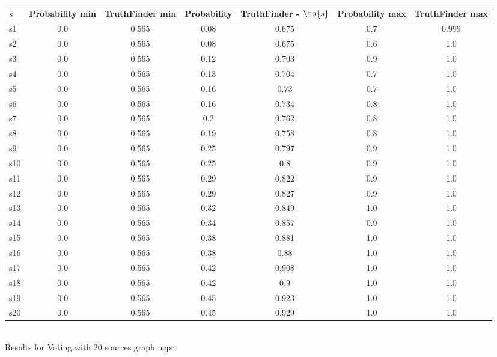 \documentclass{article}
\begin{document}
\noindent\begin{tabular}{|l|c|c|c|c|c|c|}
\hline
$s$& Probability min & TruthFinder min & Probability & TruthFinder - $\ts{s}$ & Probability max & TruthFinder max\\
\hline
s1 &0.0 & 0.565 & 0.08 & 0.675 & 0.7 & 0.999\\
\hline
s2 &0.0 & 0.565 & 0.08 & 0.675 & 0.6 & 1.0\\
\hline
s3 &0.0 & 0.565 & 0.12 & 0.703 & 0.9 & 1.0\\
\hline
s4 &0.0 & 0.565 & 0.13 & 0.704 & 0.7 & 1.0\\
\hline
s5 &0.0 & 0.565 & 0.16 & 0.73 & 0.7 & 1.0\\
\hline
s6 &0.0 & 0.565 & 0.16 & 0.734 & 0.8 & 1.0\\
\hline
s7 &0.0 & 0.565 & 0.2 & 0.762 & 0.8 & 1.0\\
\hline
s8 &0.0 & 0.565 & 0.19 & 0.758 & 0.8 & 1.0\\
\hline
s9 &0.0 & 0.565 & 0.25 & 0.797 & 0.9 & 1.0\\
\hline
s10 &0.0 & 0.565 & 0.25 & 0.8 & 0.9 & 1.0\\
\hline
s11 &0.0 & 0.565 & 0.29 & 0.822 & 0.9 & 1.0\\
\hline
s12 &0.0 & 0.565 & 0.29 & 0.827 & 0.9 & 1.0\\
\hline
s13 &0.0 & 0.565 & 0.32 & 0.849 & 1.0 & 1.0\\
\hline
s14 &0.0 & 0.565 & 0.34 & 0.857 & 0.9 & 1.0\\
\hline
s15 &0.0 & 0.565 & 0.38 & 0.881 & 1.0 & 1.0\\
\hline
s16 &0.0 & 0.565 & 0.38 & 0.88 & 1.0 & 1.0\\
\hline
s17 &0.0 & 0.565 & 0.42 & 0.908 & 1.0 & 1.0\\
\hline
s18 &0.0 & 0.565 & 0.42 & 0.9 & 1.0 & 1.0\\
\hline
s19 &0.0 & 0.565 & 0.45 & 0.923 & 1.0 & 1.0\\
\hline
s20 &0.0 & 0.565 & 0.45 & 0.929 & 1.0 & 1.0\\
\hline
\end{tabular}\\

\noindent Results for Voting with 20 sources graph ncpr.
\end{document}
